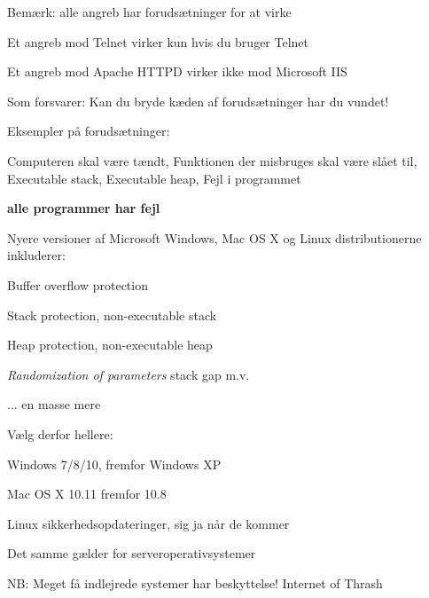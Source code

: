 \documentclass[20pt,landscape,a4paper,footrule]{foils}
\begin{document}

\begin{list1}
\item Bemærk: alle angreb har forudsætninger for at virke
\item Et angreb mod Telnet virker kun hvis du bruger Telnet
\item Et angreb mod Apache HTTPD virker ikke mod Microsoft IIS
\item Som forsvarer: Kan du bryde kæden af forudsætninger har du vundet!
\item Eksempler på forudsætninger:
\item Computeren skal være tændt, Funktionen der misbruges skal være slået til, Executable stack, Executable heap, Fejl i programmet
\end{list1}

\vskip 2cm

\centerline{\color{titlecolor}\LARGE \bf alle programmer har fejl}




\begin{list1}
\item Nyere versioner af Microsoft Windows, Mac OS X og Linux distributionerne inkluderer:
\begin{list2}
\item Buffer overflow protection
\item Stack protection, non-executable stack
\item Heap protection, non-executable heap
\item \emph{Randomization of parameters} stack gap m.v.
\item ... en masse mere
\end{list2}
\item Vælg derfor hellere:
\begin{list2}
\item Windows 7/8/10, fremfor Windows XP
\item Mac OS X 10.11 fremfor 10.8
\item Linux sikkerhedsopdateringer, sig ja når de kommer
\end{list2}
\item Det samme gælder for serveroperativsystemer
\item NB: Meget få indlejrede systemer har beskyttelse! Internet of Thrash
\end{list1}

\end{document}
